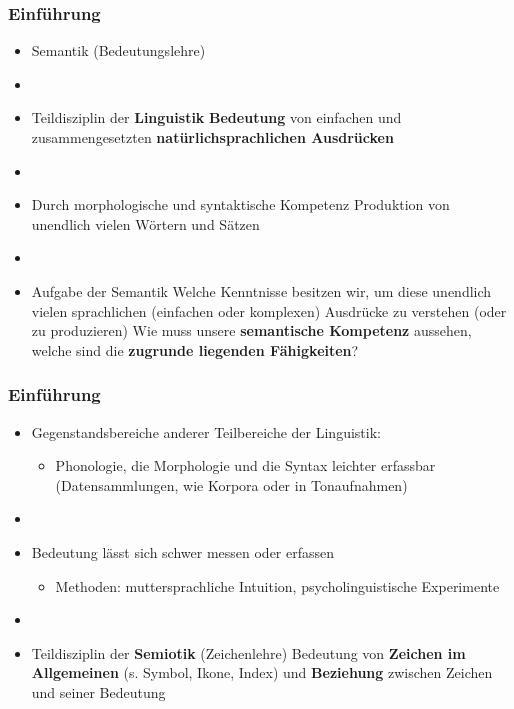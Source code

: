 \begin{frame}
\frametitle{Einführung}

\begin{itemize}
	\item Semantik (Bedeutungslehre)
	\item []
	\item Teildisziplin der \textbf{Linguistik} \ras \textbf{Bedeutung} von einfachen und zusammengesetzten \textbf{natürlichsprachlichen Ausdrücken}
	\item []
	\item Durch morphologische und syntaktische Kompetenz \ras Produktion von unendlich vielen Wörtern und Sätzen
	\item[]
	\item Aufgabe der Semantik \ras Welche Kenntnisse besitzen wir, um diese unendlich vielen sprachlichen (einfachen oder komplexen) Ausdrücke zu verstehen (oder zu produzieren) \ras Wie muss unsere \textbf{semantische Kompetenz} aussehen, welche sind die \textbf{zugrunde liegenden Fähigkeiten}?
\end{itemize}


\end{frame}



\begin{frame}
\frametitle{Einführung}

\begin{itemize}
	\item Gegenstandsbereiche anderer Teilbereiche der Linguistik:
		
		\begin{itemize}
			\item Phonologie, die Morphologie und die Syntax \ras leichter erfassbar (Datensammlungen, wie Korpora oder in Tonaufnahmen)
		\end{itemize}
	
	\item []	
	\item Bedeutung lässt sich schwer messen oder erfassen
		
		\begin{itemize}
			\item Methoden: muttersprachliche Intuition, psycholinguistische Experimente
		\end{itemize}
		
	\item[]	
	\item Teildisziplin der \textbf{Semiotik} (Zeichenlehre) \ras Bedeutung von \textbf{Zeichen im Allgemeinen} (s. Symbol, Ikone, Index) und \textbf{Beziehung} zwischen Zeichen und seiner Bedeutung
\end{itemize}

\end{frame}


